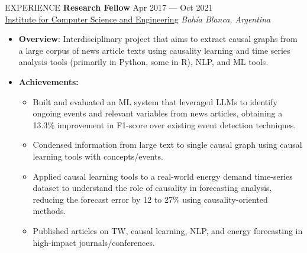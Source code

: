 \documentclass{resume} %
\begin{document}
\begin{rSection}{EXPERIENCE}
\textbf{Research Fellow} \hfill Apr 2017 --- Oct 2021\\
\underline{Institute for Computer Science and Engineering} \hfill \textit{Bahía Blanca, Argentina}\\
\vspace{-0.7cm}
\begin{itemize}
    \item \textbf{Overview}: Interdisciplinary project that aims to extract causal graphs from a large corpus of news article texts using causality learning and time series analysis tools (primarily in Python, some in R), NLP, and ML tools.
    \vspace{-0.25cm}
    \item \textbf{Achievements: }
    \vspace{-0.25cm}
    \begin{itemize}
    \item  Built and evaluated an ML system that leveraged LLMs to identify ongoing events and relevant variables from news articles, obtaining a 13.3\% improvement in F1-score over existing event detection techniques.
    \vspace{-0.25cm}
    \item Condensed information from large text to single causal graph using causal learning tools with concepts/events.
    \vspace{-0.75cm}
    \item Applied causal learning tools to a real-world energy demand time-series dataset to understand the role of causality in forecasting analysis, reducing the forecast error by 12 to 27\% using causality-oriented methods.
    \vspace{-0.7cm}
    \item Published articles on TW, causal learning, NLP, and energy forecasting in high-impact journals/conferences.
    \end{itemize}
\end{itemize}



\end{rSection}
\end{document}
